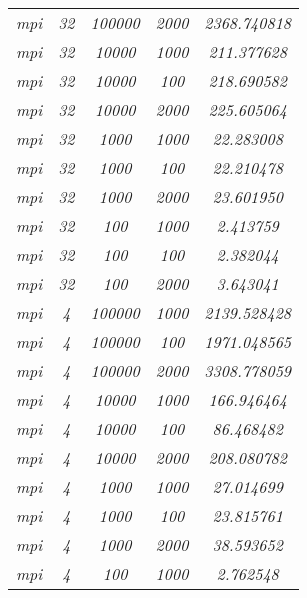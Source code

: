 \documentclass[../main.tex]{subfiles}
\begin{document}
\begin{table}[]
\begin{tabular}{|c|c|c|c|c|}
\textit{mpi}     & \textit{32}      & \textit{100000} & \textit{2000} & \textit{2368.740818} \\
\textit{mpi}     & \textit{32}      & \textit{10000}  & \textit{1000} & \textit{211.377628}  \\
\textit{mpi}     & \textit{32}      & \textit{10000}  & \textit{100}  & \textit{218.690582}  \\
\textit{mpi}     & \textit{32}      & \textit{10000}  & \textit{2000} & \textit{225.605064}  \\
\textit{mpi}     & \textit{32}      & \textit{1000}   & \textit{1000} & \textit{22.283008}   \\
\textit{mpi}     & \textit{32}      & \textit{1000}   & \textit{100}  & \textit{22.210478}   \\
\textit{mpi}     & \textit{32}      & \textit{1000}   & \textit{2000} & \textit{23.601950}   \\
\textit{mpi}     & \textit{32}      & \textit{100}    & \textit{1000} & \textit{2.413759}    \\
\textit{mpi}     & \textit{32}      & \textit{100}    & \textit{100}  & \textit{2.382044}    \\
\textit{mpi}     & \textit{32}      & \textit{100}    & \textit{2000} & \textit{3.643041}    \\
\textit{mpi}     & \textit{4}       & \textit{100000} & \textit{1000} & \textit{2139.528428} \\
\textit{mpi}     & \textit{4}       & \textit{100000} & \textit{100}  & \textit{1971.048565} \\
\textit{mpi}     & \textit{4}       & \textit{100000} & \textit{2000} & \textit{3308.778059} \\
\textit{mpi}     & \textit{4}       & \textit{10000}  & \textit{1000} & \textit{166.946464}  \\
\textit{mpi}     & \textit{4}       & \textit{10000}  & \textit{100}  & \textit{86.468482}   \\
\textit{mpi}     & \textit{4}       & \textit{10000}  & \textit{2000} & \textit{208.080782}  \\
\textit{mpi}     & \textit{4}       & \textit{1000}   & \textit{1000} & \textit{27.014699}   \\
\textit{mpi}     & \textit{4}       & \textit{1000}   & \textit{100}  & \textit{23.815761}   \\
\textit{mpi}     & \textit{4}       & \textit{1000}   & \textit{2000} & \textit{38.593652}   \\
\textit{mpi}     & \textit{4}       & \textit{100}    & \textit{1000} & \textit{2.762548}    \\

\end{tabular}
\end{table}
\end{document}
